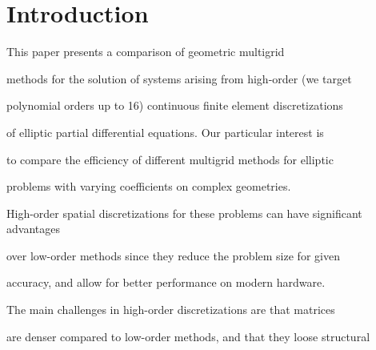 \documentclass[smallcondensed,final]{svjour3}     %
\begin{document}



\section{Introduction}



This paper presents a comparison of geometric multigrid

methods for the solution of systems arising from high-order (we target

polynomial orders up to 16) continuous finite element discretizations

of elliptic partial differential equations. Our particular interest is

to compare the efficiency of different multigrid methods for elliptic

problems with varying coefficients on complex geometries.


High-order spatial discretizations for these problems can have significant advantages

over low-order methods since they reduce the problem size for given

accuracy, and allow for better performance on modern hardware.









The main challenges in high-order discretizations are that matrices

are denser compared to low-order methods, and that they loose structural
\end{document}
